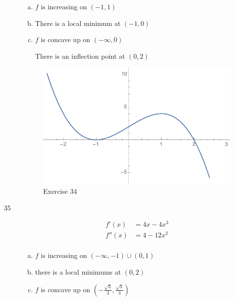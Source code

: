 \documentclass[letterpaper]{exam}
\begin{document}
\begin{description}
      \begin{enumerate}[(a)]
        \item $f$ is increasing on $(-1, 1)$

        \item There is a local minimum at $(-1, 0)$ 

        \item $f$ is concave up on $\left( -\infty, 0 \right)$ 
          
          There is an inflection point at $(0, 2)$ 

      \end{enumerate}

      \begin{figure}[H]
        \centering
        \includegraphics[scale = 0.6]{ex34.pdf}
        \caption{Exercise 34}
        \label{fig:ex34}
      \end{figure}

    \newpage

    \item[35]
      \begin{align*}
        f'(x)  & = 4x - 4x^3 \\
        f''(x) & = 4 - 12x^2 \\
      \end{align*}

      \begin{enumerate}[(a)]
        \item $f$ is increasing on $(-\infty, -1) \cup (0, 1)$

        \item there is a local minimums at $(0, 2)$ 

        \item $f$ is concave up on $\left( -\frac{\sqrt{3}}{3}, \frac{\sqrt{3}}{3} \right)$ 
          

\end{enumerate}
\end{description}
\end{document}
